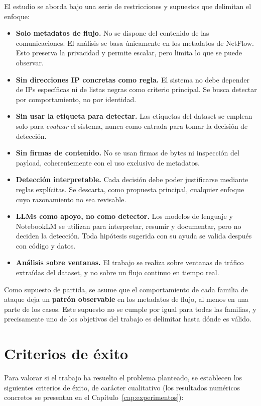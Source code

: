 El estudio se aborda bajo una serie de restricciones y supuestos que delimitan el enfoque:

\begin{itemize}
  \item \textbf{Solo metadatos de flujo.} No se dispone del contenido de las comunicaciones. El análisis se basa únicamente en los metadatos de NetFlow. Esto preserva la privacidad y permite escalar, pero limita lo que se puede observar.
  \item \textbf{Sin direcciones IP concretas como regla.} El sistema no debe depender de IPs específicas ni de listas negras como criterio principal. Se busca detectar por comportamiento, no por identidad.
  \item \textbf{Sin usar la etiqueta para detectar.} Las etiquetas del dataset se emplean solo para \emph{evaluar} el sistema, nunca como entrada para tomar la decisión de detección.
  \item \textbf{Sin firmas de contenido.} No se usan firmas de bytes ni inspección del payload, coherentemente con el uso exclusivo de metadatos.
  \item \textbf{Detección interpretable.} Cada decisión debe poder justificarse mediante reglas explícitas. Se descarta, como propuesta principal, cualquier enfoque cuyo razonamiento no sea revisable.
  \item \textbf{LLMs como apoyo, no como detector.} Los modelos de lenguaje y NotebookLM se utilizan para interpretar, resumir y documentar, pero no deciden la detección. Toda hipótesis sugerida con su ayuda se valida después con código y datos.
  \item \textbf{Análisis sobre ventanas.} El trabajo se realiza sobre ventanas de tráfico extraídas del dataset, y no sobre un flujo continuo en tiempo real.
\end{itemize}

Como supuesto de partida, se asume que el comportamiento de cada familia de ataque deja un \textbf{patrón observable} en los metadatos de flujo, al menos en una parte de los casos. Este supuesto no se cumple por igual para todas las familias, y precisamente uno de los objetivos del trabajo es delimitar hasta dónde es válido.

\section{Criterios de éxito}
\label{sec:prob_exito}

Para valorar si el trabajo ha resuelto el problema planteado, se establecen los siguientes criterios de éxito, de carácter cualitativo (los resultados numéricos concretos se presentan en el Capítulo~\ref{cap:experimentos}):


